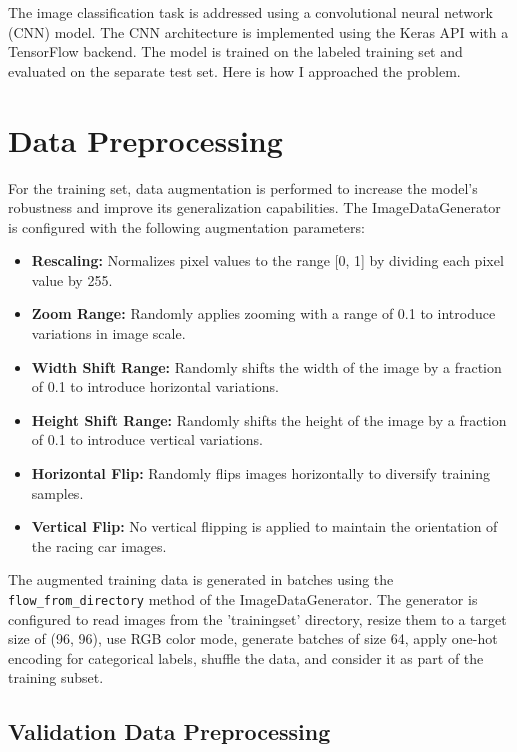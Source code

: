 \documentclass{article}
\begin{document}
The image classification task is addressed using a convolutional neural network (CNN) model. The CNN architecture is implemented using the Keras API with a TensorFlow backend. The model is trained on the labeled training set and evaluated on the separate test set.
\newline
\newline
Here is how I approached the problem.

\section{Data Preprocessing}

For the training set, data augmentation is performed to increase the model's robustness and improve its generalization capabilities. The ImageDataGenerator is configured with the following augmentation parameters:

\begin{itemize}
    \item \textbf{Rescaling:} Normalizes pixel values to the range [0, 1] by dividing each pixel value by 255.
    \item \textbf{Zoom Range:} Randomly applies zooming with a range of 0.1 to introduce variations in image scale.
    \item \textbf{Width Shift Range:} Randomly shifts the width of the image by a fraction of 0.1 to introduce horizontal variations.
    \item \textbf{Height Shift Range:} Randomly shifts the height of the image by a fraction of 0.1 to introduce vertical variations.
    \item \textbf{Horizontal Flip:} Randomly flips images horizontally to diversify training samples.
    \item \textbf{Vertical Flip:} No vertical flipping is applied to maintain the orientation of the racing car images.
\end{itemize}

The augmented training data is generated in batches using the \texttt{flow\_from\_directory} method of the ImageDataGenerator. The generator is configured to read images from the 'trainingset' directory, resize them to a target size of (96, 96), use RGB color mode, generate batches of size 64, apply one-hot encoding for categorical labels, shuffle the data, and consider it as part of the training subset.

\subsection{Validation Data Preprocessing}
\end{document}
